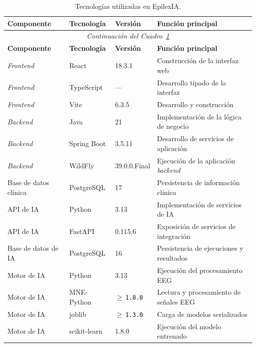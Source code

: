 \begin{longtable}{|
p{0.18\dimexpr\textwidth-8\tabcolsep-5\arrayrulewidth\relax}|
p{0.19\dimexpr\textwidth-8\tabcolsep-5\arrayrulewidth\relax}|
p{0.18\dimexpr\textwidth-8\tabcolsep-5\arrayrulewidth\relax}|
p{0.45\dimexpr\textwidth-8\tabcolsep-5\arrayrulewidth\relax}|}

\caption[Principales tecnologías utilizadas en EpilexIA]%
{Tecnologías utilizadas en EpilexIA.}
\label{tab:tecnologias_epilexia}\\
\hline
\textbf{Componente} &
\textbf{Tecnología} &
\textbf{Versión} &
\textbf{Función principal} \\
\hline
\endfirsthead

\multicolumn{4}{c}{\textit{Continuación del Cuadro~\ref{tab:tecnologias_epilexia}}}\\
\hline
\textbf{Componente} &
\textbf{Tecnología} &
\textbf{Versión} &
\textbf{Función principal} \\
\hline
\endhead

\textit{Frontend} & React & 18.3.1 &
Construcción de la interfaz web \\
\hline
\textit{Frontend} & TypeScript & --- &
Desarrollo tipado de la interfaz \\
\hline
\textit{Frontend} & Vite & 6.3.5 &
Desarrollo y construcción \\
\hline
\textit{Backend} & Java & 21 &
Implementación de la lógica de negocio \\
\hline
\textit{Backend} & Spring Boot & 3.5.11 &
Desarrollo de servicios de aplicación \\
\hline
\textit{Backend} & WildFly & 39.0.0.Final &
Ejecución de la aplicación \textit{backend} \\
\hline
Base de datos clínica & PostgreSQL & 17 &
Persistencia de información clínica \\
\hline
API de IA & Python & 3.13 &
Implementación de servicios de IA \\
\hline
API de IA & FastAPI & 0.115.6 &
Exposición de servicios de integración \\
\hline
Base de datos de IA & PostgreSQL & 16 &
Persistencia de ejecuciones y resultados \\
\hline
Motor de IA & Python & 3.13 &
Ejecución del procesamiento EEG \\
\hline
Motor de IA & MNE-Python & $\geq$\,\texttt{1.8.0} &
Lectura y procesamiento de señales EEG \\
\hline
Motor de IA & joblib & $\geq$\,\texttt{1.3.0} &
Carga de modelos serializados \\
\hline
Motor de IA & scikit-learn & 1.8.0 &
Ejecución del modelo entrenado \\
\hline

\end{longtable}
\endgroup

